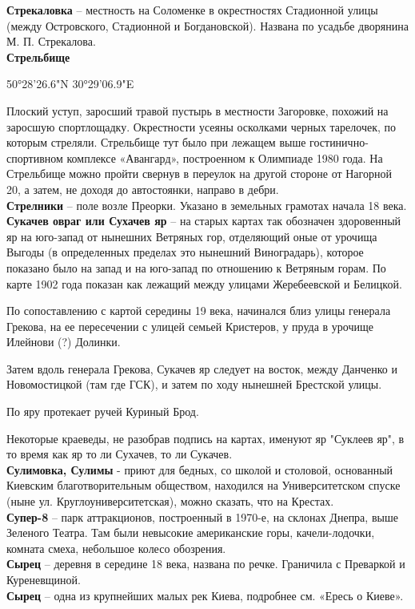 \textbf{Стрекаловка} – местность на Соломенке в окрестностях Стадионной улицы (между Островского, Стадионной и Богдановской). Названа по усадьбе дворянина М. П. Стрекалова.\\

\textbf{Стрельбище}

50°28'26.6"N 30°29'06.9"E

Плоский уступ, заросший травой пустырь в местности Загоровке, похожий на заросшую спортлощадку. Окрестности усеяны осколками черных тарелочек, по которым стреляли. Стрельбище тут было при лежащем выше  гости\-нично-спортивном комплексе «Авангард», построенном к Олимпиаде 1980 года. На Стрельбище можно пройти свернув в переулок на другой стороне от Нагорной 20, а затем, не доходя до автостоянки, направо в дебри.\\

\textbf{Стрелники} – поле возле Преорки. Указано в земельных грамотах начала 18 века.\\

\textbf{Сукачев овраг или Сухачев яр} – на старых картах так обозначен здоровенный яр на юго-запад от нынешних Ветряных гор, отделяющий оные от урочища Выгоды (в определенных пределах это нынешний Виноградарь), которое показано было на запад и на юго-запад по отношению к Ветряным горам. По карте 1902 года показан как лежащий между улицами Жеребеевской и Белицкой.

По сопоставлению с картой середины 19 века, начинался близ улицы генерала Грекова, на ее пересечении с улицей семьей Кристеров, у пруда в урочище Илейнови (?) Долинки.

Затем вдоль генерала Грекова, Сукачев яр следует на восток, между Данченко и Новомостицкой (там где ГСК), и затем по ходу нынешней Брестской улицы.

По яру протекает ручей Куриный Брод.

Некоторые краеведы, не разобрав подпись на картах, именуют яр "Суклеев яр", в то время как яр то ли Сухачев, то ли Сукачев.\\

\textbf{Сулимовка, Сулимы} - приют для бедных, со школой и столовой, основанный Киевским благотворительным обществом, находился на Университетском спуске (ныне ул. Круглоуниверситетская), можно сказать, что на Крестах.\\

\textbf{Супер-8} – парк аттракционов, построенный в 1970-е, на склонах Днепра, выше Зеленого Театра. Там были невысокие американские горы, качели-лодочки, комната смеха, небольшое колесо обозрения.\\

\textbf{Сырец} – деревня в середине 18 века, названа по речке. Граничила с Преваркой и Куреневщиной.\\

\textbf{Сырец} – одна из крупнейших малых рек Киева, подробнее см. «Ересь о Киеве».
